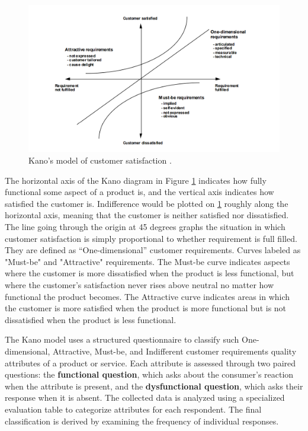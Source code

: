 \documentclass[../main.tex]{subfiles}
\begin{document}
\begin{figure}[H]
        \centering
        \includegraphics[scale=0.8]{img/3-background/kano/kano.png}
        \caption{Kano’s model of customer satisfaction \cite{kanomodel1996}.}
        \label{fig:kano}
\end{figure}

The horizontal axis of the Kano diagram in Figure \ref{fig:kano} indicates how fully functional some aspect of a product is, and the vertical axis 
indicates how satisfied the customer is. Indifference would be plotted on \ref{fig:kano} roughly along the horizontal axis, meaning that the customer is neither satisfied nor dissatisfied. The line going through the origin at 45 degrees graphs the situation in which customer satisfaction is simply proportional to whether requirement is full filled. They are defined as “One-dimensional” customer requirements. Curves labeled as "Must-be" and 
"Attractive" requirements. The Must-be curve indicates aspects where the customer is more dissatisfied when the product is less functional, but where 
the customer’s satisfaction never rises above neutral no matter how functional the product becomes. The Attractive curve indicates areas in which 
the customer is more satisfied when the product is more functional but is not dissatisfied when the product is less functional.  \cite{berger1993kano}

The Kano model uses a structured questionnaire to classify such One-dimensional, Attractive, Must-be, and Indifferent customer requirements quality attributes of a product or service. Each attribute is assessed through two paired questions: the \textbf{functional question}, which asks about the consumer’s reaction when the attribute is present, and the \textbf{dysfunctional question}, which asks their response when it is absent. The collected data is analyzed using a specialized evaluation table to categorize attributes for each respondent. The final classification is derived by examining the frequency of individual responses. \cite{kanomodel1996}
\end{document}
